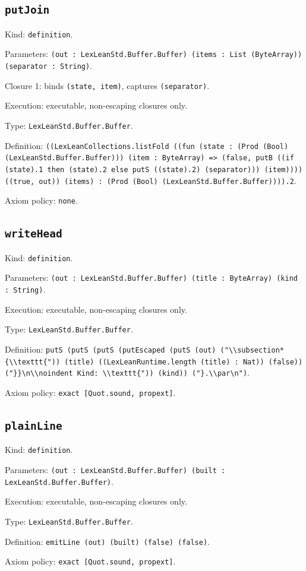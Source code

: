 \documentclass[11pt]{article}
\begin{document}
\subsection*{\texttt{putJoin}}
\noindent Kind: \texttt{definition}.\par
\noindent Parameters: \texttt{(out : LexLeanStd.Buffer.Buffer) (items : List (ByteArray)) (separator : String)}.\par
\noindent Closure 1: binds \texttt{(state, item)}, captures \texttt{(separator)}.\par
\noindent Execution: executable, non-escaping closures only.\par
\noindent Type: \texttt{LexLeanStd.Buffer.Buffer}.\par
\noindent Definition: \texttt{((LexLeanCollections.listFold ((fun (state : (Prod (Bool) (LexLeanStd.Buffer.Buffer))) (item : ByteArray) => (false, putB ((if (state).1 then (state).2 else putS ((state).2) (separator))) (item)))) ((true, out)) (items) : (Prod (Bool) (LexLeanStd.Buffer.Buffer)))).2}.\par
\noindent Axiom policy: \texttt{none}.\par
\subsection*{\texttt{writeHead}}
\noindent Kind: \texttt{definition}.\par
\noindent Parameters: \texttt{(out : LexLeanStd.Buffer.Buffer) (title : ByteArray) (kind : String)}.\par
\noindent Execution: executable, non-escaping closures only.\par
\noindent Type: \texttt{LexLeanStd.Buffer.Buffer}.\par
\noindent Definition: \texttt{putS (putS (putS (putEscaped (putS (out) ("\textbackslash{}\textbackslash{}subsection*\{\textbackslash{}\textbackslash{}texttt\{")) (title) ((LexLeanRuntime.length (title) : Nat)) (false)) ("\}\}\textbackslash{}n\textbackslash{}\textbackslash{}noindent Kind: \textbackslash{}\textbackslash{}texttt\{")) (kind)) ("\}.\textbackslash{}\textbackslash{}par\textbackslash{}n")}.\par
\noindent Axiom policy: \texttt{exact [Quot.sound, propext]}.\par
\subsection*{\texttt{plainLine}}
\noindent Kind: \texttt{definition}.\par
\noindent Parameters: \texttt{(out : LexLeanStd.Buffer.Buffer) (built : LexLeanStd.Buffer.Buffer)}.\par
\noindent Execution: executable, non-escaping closures only.\par
\noindent Type: \texttt{LexLeanStd.Buffer.Buffer}.\par
\noindent Definition: \texttt{emitLine (out) (built) (false) (false)}.\par
\noindent Axiom policy: \texttt{exact [Quot.sound, propext]}.\par
\end{document}
